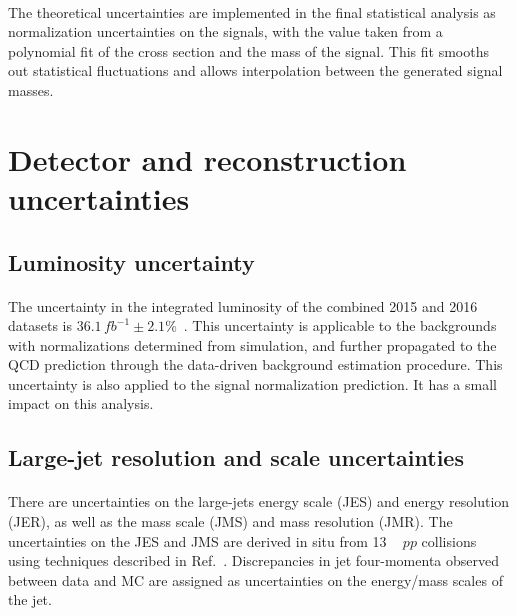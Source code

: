 \paragraph{}
The theoretical uncertainties are implemented in the final statistical analysis as normalization uncertainties on the signals, with the value taken from a polynomial fit of the cross section and the mass of the signal.
This fit smooths out statistical fluctuations and allows interpolation between the generated signal masses.


\section{Detector and reconstruction uncertainties}
\label{sec:boosted-systematics-detector}
\subsection{Luminosity uncertainty} 
\paragraph{}
The uncertainty in the integrated luminosity of the combined 2015 and 2016 datasets is $36.1\,fb^{-1}\pm2.1$\%~\cite{LumiCiteUP}.
This uncertainty is applicable to the backgrounds with normalizations determined from simulation, and further propagated to the QCD prediction through the data-driven background estimation procedure.
This uncertainty is also applied to the signal normalization prediction.
It has a small impact on this analysis. 

\subsection{Large-\R jet resolution and scale uncertainties} 
\paragraph{}
There are uncertainties on the large-\R jets energy scale (JES) and energy resolution (JER), as well as the mass scale (JMS) and mass resolution (JMR).
The uncertainties on the JES and JMS are derived in situ from 13 \TeV~ $pp$ collisions using techniques described in Ref.~\cite{JetMassAndSubstructure}. 
Discrepancies in jet four-momenta observed between data and MC are assigned as uncertainties on the energy/mass scales of the jet.

